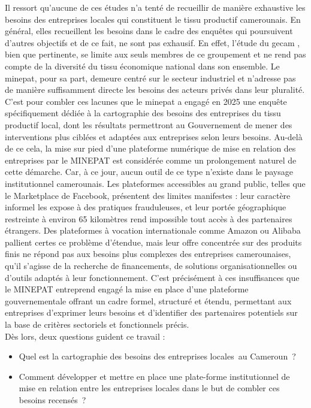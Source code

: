 \documentclass[12pt, a4paper, oneside]{report}
\begin{document}
	Il ressort qu’aucune de ces études n’a tenté de recueillir de manière exhaustive les besoins des entreprises locales qui constituent le tissu productif camerounais. En général, elles recueillent les besoins dans le cadre des enquêtes qui poursuivent d’autres objectifs et de ce fait, ne sont pas exhausif. En effet, l’étude du \gls{gecam} , bien que pertinente, se limite aux seuls membres de ce groupement et ne rend pas compte de la diversité du tissu économique national dans son ensemble. Le \gls{minepat}, pour sa part, demeure centré sur le secteur industriel et n’adresse pas de manière suffisamment directe les besoins des acteurs privés dans leur pluralité.\\
	
	C’est pour combler ces lacunes que le \gls{minepat} a engagé en 2025 une enquête spécifiquement dédiée à la cartographie des besoins des entreprises du tissu productif local, dont les résultats permettront au Gouvernement de mener des interventions plus ciblées et adaptées aux entreprises selon leurs besoins. Au-delà de ce cela, la mise sur pied d’une plateforme numérique de mise en relation des entreprises par le MINEPAT est considérée comme un prolongement naturel de cette démarche. Car, à ce jour, aucun outil de ce type n’existe dans le paysage institutionnel camerounais. Les plateformes accessibles au grand public, telles que le Marketplace de Facebook, présentent des limites manifestes : leur caractère informel les expose à des pratiques frauduleuses, et leur portée géographique restreinte à environ 65 kilomètres rend impossible tout accès à des partenaires étrangers. Des plateformes à vocation internationale comme Amazon ou Alibaba pallient certes ce problème d’étendue, mais leur offre concentrée sur des produits finis ne répond pas aux besoins plus complexes des entreprises camerounaises, qu’il s’agisse de la recherche de financements, de solutions organisationnelles ou d’outils adaptés à leur fonctionnement. C’est précisément à ces insuffisances que le MINEPAT entreprend engagé la mise en place d’une plateforme gouvernementale offrant un cadre formel, structuré et étendu, permettant aux entreprises  d’exprimer leurs besoins et d’identifier des partenaires potentiels sur la base de critères sectoriels et fonctionnels précis. \\
	
	Dès lors, deux questions guident ce travail : 
	\begin{itemize}
		\item Quel est la cartographie des besoins des entreprises locales au Cameroun ? 
		\item Comment développer et mettre en place une plate-forme institutionnel de mise en relation entre les entreprises locales dans le but de combler ces besoins recensés ?
	\end{itemize}
	\newpage
\end{document}

